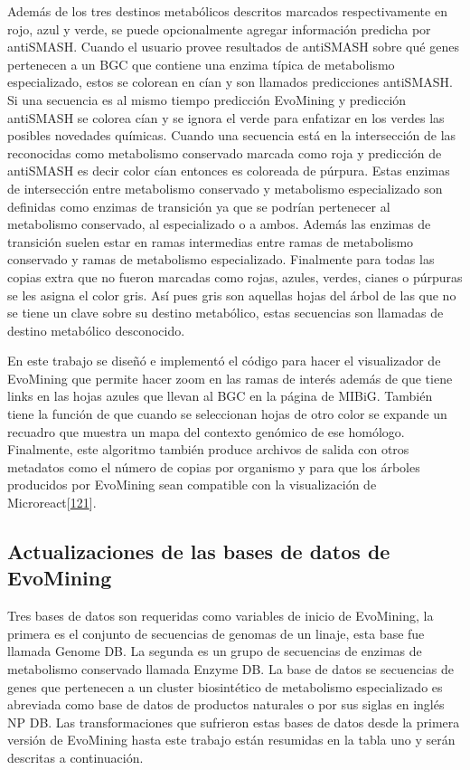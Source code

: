 \documentclass[12pt,twoside]{reedthesis}
\begin{document}
  Además de los tres destinos metabólicos descritos marcados
  respectivamente en rojo, azul y verde, se puede opcionalmente agregar
  información predicha por antiSMASH. Cuando el usuario provee resultados
  de antiSMASH sobre qué genes pertenecen a un BGC que contiene una enzima
  típica de metabolismo especializado, estos se colorean en cían y son
  llamados predicciones antiSMASH. Si una secuencia es al mismo tiempo
  predicción EvoMining y predicción antiSMASH se colorea cían y se ignora
  el verde para enfatizar en los verdes las posibles novedades químicas.
  Cuando una secuencia está en la intersección de las reconocidas como
  metabolismo conservado marcada como roja y predicción de antiSMASH es
  decir color cían entonces es coloreada de púrpura. Estas enzimas de
  intersección entre metabolismo conservado y metabolismo especializado
  son definidas como enzimas de transición ya que se podrían pertenecer al
  metabolismo conservado, al especializado o a ambos. Además las enzimas
  de transición suelen estar en ramas intermedias entre ramas de
  metabolismo conservado y ramas de metabolismo especializado. Finalmente
  para todas las copias extra que no fueron marcadas como rojas, azules,
  verdes, cianes o púrpuras se les asigna el color gris. Así pues gris son
  aquellas hojas del árbol de las que no se tiene un clave sobre su
  destino metabólico, estas secuencias son llamadas de destino metabólico
  desconocido.
  
  En este trabajo se diseñó e implementó el código para hacer el
  visualizador de EvoMining que permite hacer zoom en las ramas de interés
  además de que tiene links en las hojas azules que llevan al BGC en la
  página de MIBiG. También tiene la función de que cuando se seleccionan
  hojas de otro color se expande un recuadro que muestra un mapa del
  contexto genómico de ese homólogo. Finalmente, este algoritmo también
  produce archivos de salida con otros metadatos como el número de copias
  por organismo y para que los árboles producidos por EvoMining sean
  compatible con la visualización de
  Microreact{[}\protect\hyperlink{ref-argimon_microreact_2016}{121}{]}.
  
  \subsection{Actualizaciones de las bases de datos de
  EvoMining}\label{actualizaciones-de-las-bases-de-datos-de-evomining}
  
  Tres bases de datos son requeridas como variables de inicio de
  EvoMining, la primera es el conjunto de secuencias de genomas de un
  linaje, esta base fue llamada Genome DB. La segunda es un grupo de
  secuencias de enzimas de metabolismo conservado llamada Enzyme DB. La
  base de datos se secuencias de genes que pertenecen a un cluster
  biosintético de metabolismo especializado es abreviada como base de
  datos de productos naturales o por sus siglas en inglés NP DB. Las
  transformaciones que sufrieron estas bases de datos desde la primera
  versión de EvoMining hasta este trabajo están resumidas en la tabla uno
  y serán descritas a continuación.
  
\end{document}
